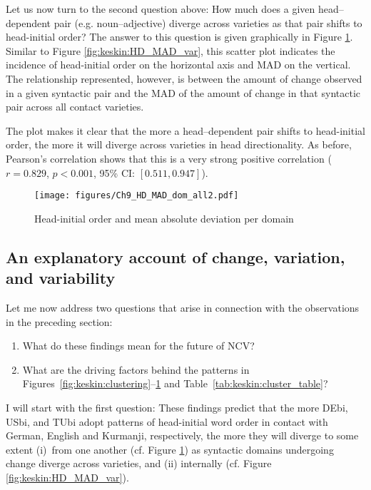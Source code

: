 \documentclass[output=paper,colorlinks,citecolor=brown]{langscibook}
\begin{document}

Let us now turn to the second question above: How much does a given head--dependent pair (e.g. noun--adjective) diverge across varieties as that pair shifts to head-initial order? The answer to this question is given graphically in Figure \ref{fig:keskin:HD_MAD_dom_all}. Similar to Figure \ref{fig:keskin:HD_MAD_var}, this scatter plot indicates the incidence of head-initial order on the horizontal axis and MAD on the vertical. The relationship represented, however, is between the amount of change observed in a given syntactic pair and the MAD of the amount of change in that syntactic pair across all contact varieties.

The plot makes it clear that the more a head--dependent pair shifts to head-initial order, the more it will diverge across varieties in head directionality. As before, Pearson's correlation shows that this is a very strong positive correlation ($r = 0.829$, $p < 0.001$, 95\% CI: $[0.511, 0.947]$). 

\begin{figure}
  \texttt{[image: figures/Ch9\_HD\_MAD\_dom\_all2.pdf]}
  \caption{Head-initial order and mean absolute deviation per domain}
  \label{fig:keskin:HD_MAD_dom_all}
\end{figure}

\subsection{An explanatory account of change, variation, and variability}
\label{sec:keskin:unif_expl}

Let me now address two questions that arise in connection with the observations in the preceding section:

\begin{enumerate}
    \item What do these findings mean for the future of NCV? 
    \item What are the driving factors behind the patterns in Figures~\ref{fig:keskin:clustering}--\ref{fig:keskin:HD_MAD_dom_all} and Table~\ref{tab:keskin:cluster_table}?
\end{enumerate}

I will start with the first question: These findings predict that the more DEbi, USbi, and TUbi adopt patterns of head-initial word order in contact with German, English and Kurmanji, respectively, the more they will diverge to some extent (i)~from one another (cf. Figure \ref{fig:keskin:HD_MAD_dom_all}) as syntactic domains undergoing change diverge across varieties, and (ii) internally (cf. Figure \ref{fig:keskin:HD_MAD_var}). 
\end{document}
